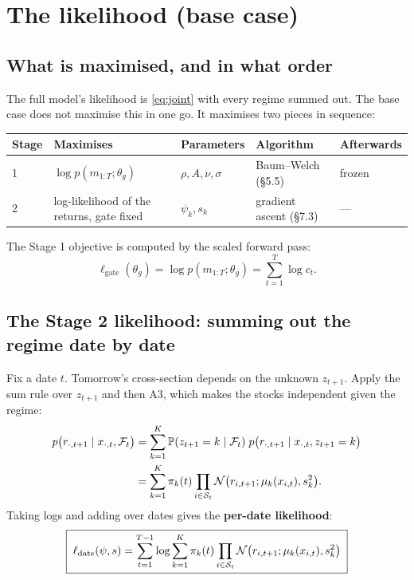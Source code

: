 \section{The likelihood (base case)}

\subsection{What is maximised, and in what order}

The full model's likelihood is \eqref{eq:joint} with every regime summed out. The base case does not maximise this in one go. It maximises two pieces in sequence:
\begin{center}
\renewcommand{\arraystretch}{1.25}
\begin{tabularx}{\textwidth}{@{}lXllX@{}}
\toprule
Stage & Maximises & Parameters & Algorithm & Afterwards \\
\midrule
1 & $\log p(m_{1:T};\theta_g)$ & $\rho,A,\nu,\sigma$ & Baum--Welch (\S5.5) & frozen \\
2 & log-likelihood of the returns, gate fixed & $\psi_k,s_k$ & gradient ascent (\S7.3) & --- \\
\bottomrule
\end{tabularx}
\end{center}
The Stage 1 objective is computed by the scaled forward pass:
\begin{equation}
\ell_{\text{gate}}(\theta_g)=\log p(m_{1:T};\theta_g)=\sum_{t=1}^T\log c_t.
\end{equation}

\subsection{The Stage 2 likelihood: summing out the regime date by date}

Fix a date $t$. Tomorrow's cross-section depends on the unknown $z_{t+1}$. Apply the sum rule over $z_{t+1}$ and then A3, which makes the stocks independent given the regime:
\begin{align}
p\big(r_{\cdot,t+1}\mid x_{\cdot,t},\mathcal{F}_t\big)&=\sum_{k=1}^K\mathbb P(z_{t+1}=k\mid\mathcal{F}_t)\;p\big(r_{\cdot,t+1}\mid x_{\cdot,t},z_{t+1}=k\big)\nonumber\\
&=\sum_{k=1}^K\pi_k(t)\prod_{i\in\mathcal S_t}\mathcal{N}\big(r_{i,t+1};\mu_k(x_{i,t}),s_k^2\big).
\end{align}
Taking logs and adding over dates gives the \textbf{per-date likelihood}:
\begin{equation}\label{eq:ldate}
\boxed{\;\ell_{\text{date}}(\psi,s)=\sum_{t=1}^{T-1}\log\sum_{k=1}^K\pi_k(t)\prod_{i\in\mathcal S_t}\mathcal{N}\big(r_{i,t+1};\mu_k(x_{i,t}),s_k^2\big)\;}
\end{equation}

